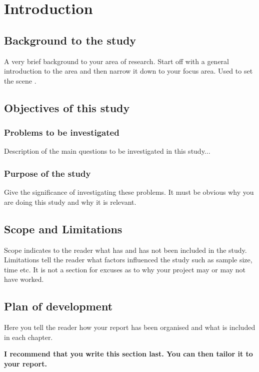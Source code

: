 \chapter{Introduction}

\section{Background to the study}
A very brief background to your area of research. Start off with a general introduction to the area and
then narrow it down to your focus area. Used to set the scene \cite{Knight2013}.
\section{Objectives of this study}
\subsection{Problems to be investigated}
Description of the main questions to be investigated in this study...
\subsection{Purpose of the study}
Give the significance of investigating these problems. It must be obvious why you are doing this study
and why it is relevant.

\section{Scope and Limitations}
Scope indicates to the reader what has and has not been included in the study. Limitations tell the
reader what factors influenced the study such as sample size, time etc. It is not a section for excuses as
to why your project may or may not have worked.

\section{Plan of development}
Here you tell the reader how your report has been organised and what is included in each
chapter.

{\bf I recommend that you write this section last. You can then tailor it to your report.}
